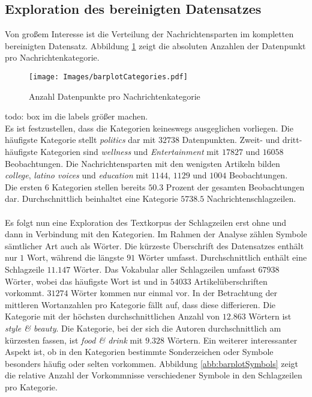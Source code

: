 \documentclass[a4paper,11pt]{article}
\begin{document}
\subsection{Exploration des bereinigten Datensatzes}

Von großem Interesse ist die Verteilung der Nachrichtensparten im kompletten bereinigten Datensatz.
Abbildung \ref{abb:barplotCategories} zeigt die absoluten Anzahlen der Datenpunkt pro Nachrichtenkategorie. 

\begin{figure}[ht]
    \centering
\texttt{[image: Images/barplotCategories.pdf]} 
\label{abb:barplotCategories}
\caption{Anzahl Datenpunkte pro Nachrichtenkategorie}
\end{figure}
todo: box im die labels größer machen.\\

Es ist festzustellen, dass die Kategorien keineswegs ausgeglichen vorliegen. Die häufigste Kategorie stellt \textit{politics} dar mit $32738$ Datenpunkten. Zweit- und dritt-häufigste Kategorien sind \textit{wellness} und \textit{Entertainment} mit $17827$ und $16058$ Beobachtungen. Die Nachrichtensparten mit den wenigsten Artikeln bilden \textit{college}, \textit{latino voices} und \textit{education} mit $1144$, $1129$ und $1004$ Beobachtungen.\\
Die ersten $6$ Kategorien stellen bereits $50.3$ Prozent der gesamten Beobachtungen dar. Durchschnittlich beinhaltet eine Kategorie $5738.5$ Nachrichtenschlagzeilen.\\
\\
Es folgt nun eine Exploration des Textkorpus der Schlagzeilen erst ohne und dann in Verbindung mit den Kategorien. Im Rahmen der Analyse zählen Symbole sämtlicher Art auch als Wörter. Die kürzeste Überschrift des Datensatzes enthält nur $1$ Wort, während die längste $91$ Wörter umfasst. Durchschnittlich enthält eine Schlagzeile $11.147$ Wörter. Das Vokabular aller Schlagzeilen umfasst $67938$ Wörter, wobei  das häufigste Wort ist und in $54033$ Artikelüberschriften vorkommt. $31274$ Wörter kommen nur einmal vor. In der Betrachtung der mittleren Wortanzahlen pro Kategorie fällt auf, dass diese differieren. Die Kategorie mit der höchsten durchschnittlichen Anzahl von $12.863$ Wörtern ist \textit{style \& beauty}. Die Kategorie, bei der sich die Autoren durchschnittlich am kürzesten fassen, ist \textit{food \& drink} mit $9.328$ Wörtern. Ein weiterer interessanter Aspekt ist, ob in den Kategorien bestimmte Sonderzeichen oder Symbole besonders häufig oder selten vorkommen. Abbildung \ref{abb:barplotSymbols} zeigt die relative Anzahl der Vorkommnisse verschiedener Symbole in den Schlagzeilen pro Kategorie.
\end{document}

